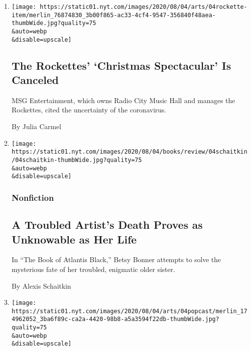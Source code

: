 \begin{enumerate}
\def\labelenumi{\arabic{enumi}.}
\item
  \href{/2020/08/04/theater/radio-city-rockettes-christmas-canceled.html}{}

  \texttt{[image: https://static01.nyt.com/images/2020/08/04/arts/04rockette-item/merlin\_76874830\_3b00f865-ac33-4cf4-9547-356840f48aea-thumbWide.jpg?quality=75\\\&auto=webp\\\&disable=upscale]}

  \hypertarget{the-rockettes-christmas-spectacular-is-canceled}{%
  \subsection{The Rockettes' `Christmas Spectacular' Is
  Canceled}\label{the-rockettes-christmas-spectacular-is-canceled}}

  MSG Entertainment, which owns Radio City Music Hall and manages the
  Rockettes, cited the uncertainty of the coronavirus.

  By Julia Carmel
\item
  \href{/2020/08/04/books/review/betsy-bonner-the-book-of-atlantis-black.html}{}

  \texttt{[image: https://static01.nyt.com/images/2020/08/04/books/review/04schaitkin/04schaitkin-thumbWide.jpg?quality=75\\\&auto=webp\\\&disable=upscale]}

  \hypertarget{nonfiction}{%
  \subsubsection{Nonfiction}\label{nonfiction}}

  \hypertarget{a-troubled-artists-death-proves-as-unknowable-as-her-life}{%
  \subsection{A Troubled Artist's Death Proves as Unknowable as Her
  Life}\label{a-troubled-artists-death-proves-as-unknowable-as-her-life}}

  In ``The Book of Atlantis Black,'' Betsy Bonner attempts to solve the
  mysterious fate of her troubled, enigmatic older sister.

  By Alexis Schaitkin
\item
  \href{/2020/08/04/arts/music/taylor-swift-folklore-questions.html}{}

  \texttt{[image: https://static01.nyt.com/images/2020/08/04/arts/04popcast/merlin\_174962052\_3ba6f89c-ca2a-4420-98b8-a5a3594f22db-thumbWide.jpg?quality=75\\\&auto=webp\\\&disable=upscale]}


\end{enumerate}
